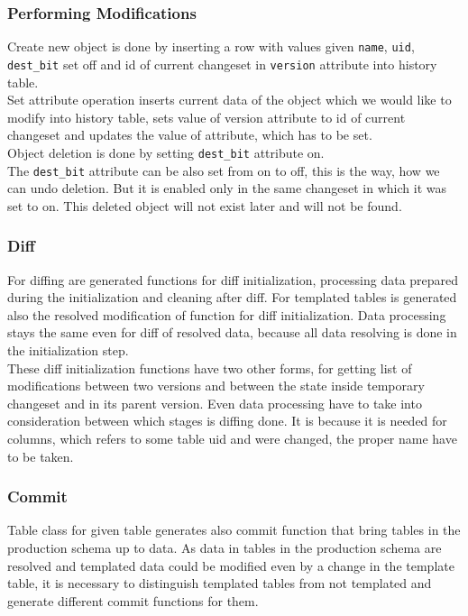 \documentclass[deska]{subfiles}
\begin{document}
\subsubsection{Performing Modifications}
Create new object is done by inserting a row with values given {\tt name}, {\tt uid}, {\tt dest\_bit} set off and id of current changeset in {\tt version} attribute into history table.\\
Set attribute operation inserts current data of the object which we would like to modify into history table, sets value of version attribute to id of current changeset and updates the value of attribute, which has to be set.\\
Object deletion is done by setting {\tt dest\_bit} attribute on.\\
The {\tt dest\_bit} attribute can be also set from on to off, this is the way, how we can undo deletion. But it is enabled only in the same changeset in which it was set to on. This deleted object will not exist later and will not be found.

\subsubsection{Diff}
For diffing are generated functions for diff initialization, processing data prepared during the initialization and cleaning after diff. For templated tables is generated also the resolved modification of function for diff initialization. Data processing stays the same even for diff of resolved data, because all data resolving is done in the initialization step.\\
These diff initialization functions have two other forms, for getting list of modifications between two versions and between the state inside temporary changeset and in its parent version. Even data processing have to take into consideration between which stages is diffing done. It is because it is needed for columns, which refers to some table uid and were changed, the proper name have to be taken.

\subsubsection{Commit}
Table class for given table generates also commit function that bring tables in the production schema up to data. As data in tables in the production schema are resolved and templated data could be modified even by a change in the template table, it is necessary to distinguish templated tables from not templated and generate different commit functions for them.
\end{document}
